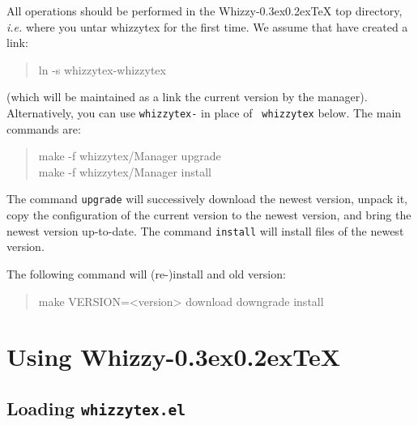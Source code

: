 \documentclass[12pt]{article}
\makeatletter
\let \lst \verb
\def \whizzy {{Whizzy\kern -0.3ex\raise 0.2ex\hbox{\let \@\relax\TeX}}}
\makeatother
\begin{document}
All operations should be performed in the {\whizzy} top directory, {\em
i.e.} where you untar whizzytex for the first time. We assume that have 
created a link: 
\begin{quote}
\begin{tt}
ln -s whizzytex-\version\space whizzytex
\end{tt}
\end{quote}
(which will be maintained as a link the current version by the manager). 
Alternatively, you can  use {\tt whizzytex-\version} in place of {\tt
whizzytex} below. The main commands are:
\begin{quote}
\begin{tt}
make -f whizzytex/Manager upgrade \\
make -f whizzytex/Manager install
\end{tt}
\end{quote}
The command \lst"upgrade" will successively download the newest version,
unpack it, copy the configuration of the current version to the newest
version, and bring the newest version up-to-date. The command \lst"install"
will install files of the newest version. 

The following command will (re-)install and old version:
\begin{quote}
\begin{tt}
make VERSION=<version> download downgrade install
\end{tt}
\end{quote}

\section {Using {\whizzy}} 

\label{using}

\subsection {Loading {\tt whizzytex.el}}
\end{document}
